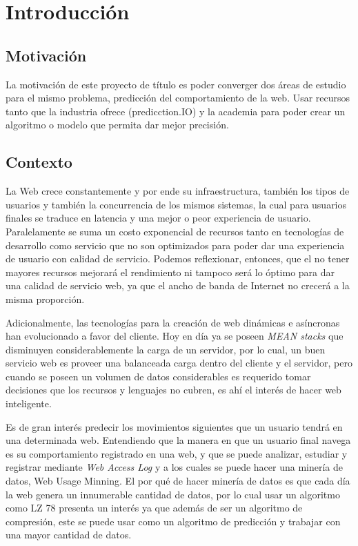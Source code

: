 \chapter[Introducción]{Introducción}
\label{ch:intro}

\section{Motivación}
\label{sec:motivacion}

La motivación de este proyecto de título es poder converger dos áreas de estudio para el mismo problema, predicción del comportamiento de la web. Usar recursos tanto que la industria ofrece (predicction.IO) y la academia para poder crear un algoritmo o modelo que permita dar mejor precisión.

\section{Contexto}
\label{sec:contexto}

  La Web crece constantemente y por ende su infraestructura, también los tipos de usuarios y  también la concurrencia de los mismos sistemas, la cual para usuarios finales se traduce en latencia y una mejor o peor experiencia de usuario. 
  Paralelamente se suma un costo exponencial de recursos tanto en tecnologías de desarrollo como servicio que no son optimizados para poder dar una experiencia de usuario con calidad de servicio. Podemos reflexionar, entonces, que el no tener mayores recursos mejorará el rendimiento ni tampoco será lo óptimo para dar una calidad de servicio web, ya que el ancho de banda de Internet no crecerá a la misma proporción.
   
  Adicionalmente, las tecnologías para la creación de web dinámicas e asíncronas han evolucionado a favor del cliente.
  Hoy en día ya se poseen \emph{MEAN stacks} que disminuyen considerablemente la carga de un servidor, por lo cual, un buen servicio web es proveer una balanceada carga dentro del cliente y el servidor, pero cuando se poseen un volumen de datos considerables es requerido tomar decisiones que los recursos y lenguajes no cubren, es ahí el interés de hacer  web inteligente.

  Es de gran interés predecir los movimientos siguientes que un usuario tendrá en una determinada web.
  Entendiendo que la manera en que un usuario final navega es su comportamiento registrado en una web, y que se puede analizar, estudiar y registrar mediante \emph{Web Access Log} y a los cuales se puede hacer una minería de datos, Web Usage Minning. El por qué de hacer minería de datos es que cada día la web genera un innumerable cantidad de datos, por lo cual usar un algoritmo como LZ 78 presenta un interés ya que además de ser un algoritmo de compresión, este se puede usar como un algoritmo de predicción y trabajar con una mayor cantidad de datos.
  
